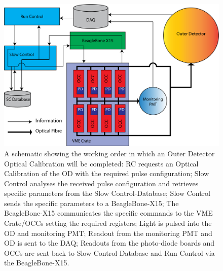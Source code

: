 \begin{figure}[ht]
    \centering
    \includegraphics[width=\textwidth]{Figures/OCS.png}
    \caption{A schematic showing the working order in which an Outer Detector Optical Calibration will be completed: RC requests an Optical Calibration of the OD with the required pulse configuration; Slow Control analyses the received pulse configuration and retrieves specific parameters from the Slow Control-Database; Slow Control sends the specific parameters to a BeagleBone-X15; The BeagleBone-X15 communicates the specific commands to the VME Crate/OCCs setting the required registers; Light is pulsed into the OD and monitoring PMT; Readout from the monitoring PMT and OD is sent to the DAQ; Readouts from the photo-diode boards and OCCs are sent back to Slow Control-Database and Run Control via the BeagleBone-X15.}
    \label{fig:OCS_Flow}
\end{figure}